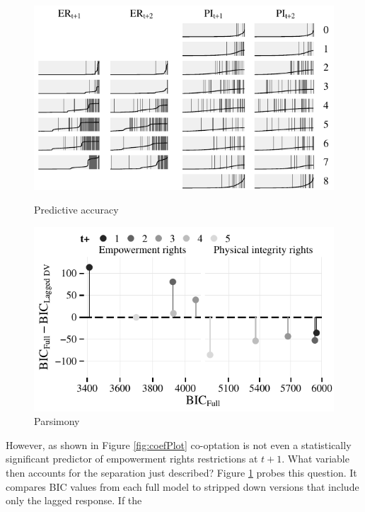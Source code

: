\begin{figure}[h]
  \begin{minipage}[c]{.49\linewidth}
    \centering
    \includegraphics[width=\linewidth]{./sections/03replication/separation_revise.pdf}
    \caption{Predictive accuracy}
    \label{fig:sepPlot}
  \end{minipage}
  \hfill
  \begin{minipage}[c]{.49\linewidth}
    \centering
    \includegraphics[width=\linewidth]{./sections/03replication/bicDifferences.pdf}
    \caption{Parsimony}
    \label{fig:bicDifferences}
  \end{minipage}
\end{figure}
However, as shown in Figure \ref{fig:coefPlot} co-optation
is not even a statistically significant predictor of
empowerment rights restrictions at $t+1$. What
variable then accounts for the separation just described? 
Figure \ref{fig:bicDifferences} probes this question. It
compares BIC values from each full model to stripped down 
versions that include only the lagged response. If the 

